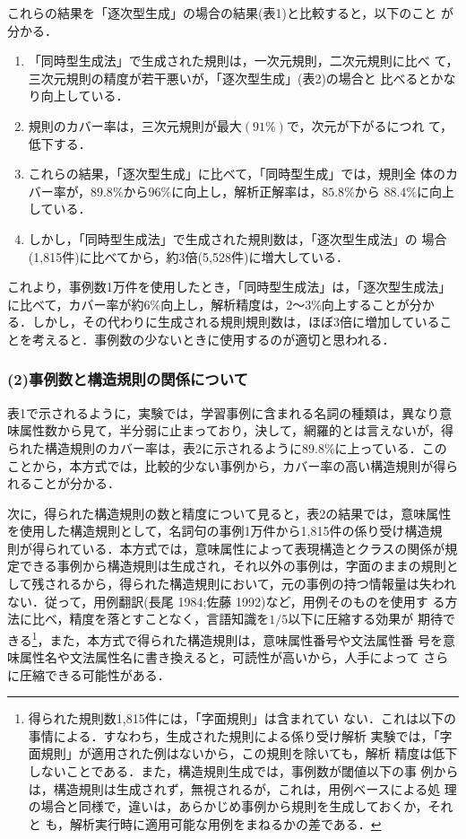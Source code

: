 これらの結果を「逐次型生成」の場合の結果(表1)と比較すると，以下のこと
が分かる．\vspace{\baselineskip}
\begin{enumerate}
 \item 「同時型生成法」で生成された規則は，一次元規則，二次元規則に比べ
       て，三次元規則の精度が若干悪いが，「逐次型生成」(表2)の場合と
       比べるとかなり向上している．
 \item 規則のカバー率は，三次元規則が最大$(91\%)$で，次元が下がるにつれ
       て，低下する．
 \item これらの結果，「逐次型生成」に比べて，「同時型生成」では，規則全
       体のカバー率が，$89.8\%$から$96\%$に向上し，解析正解率は，$85.8\%$から
       $88.4\%$に向上している．
 \item しかし，「同時型生成法」で生成された規則数は，「逐次型生成法」の
       場合(1,815件)に比べてから，約3倍(5,528件)に増大している．
\end{enumerate}\vspace{\baselineskip}

これより，事例数1万件を使用したとき，「同時型生成法」は，「逐次型生成法」
に比べて，カバー率が約$6\%$向上し，解析精度は，$2〜3\%$向上することが分か
る．しかし，その代わりに生成される規則規則数は，ほぼ3倍に増加しているこ
とを考えると．事例数の少ないときに使用するのが適切と思われる．
\subsubsection*{(2)事例数と構造規則の関係について}

表1で示されるように，実験では，学習事例に含まれる名詞の種類は，異なり意
味属性数から見て，半分弱に止まっており，決して，網羅的とは言えないが，得
られた構造規則のカバー率は，表2に示されるように89.8\%に上っている．この
ことから，本方式では，比較的少ない事例から，カバー率の高い構造規則が得ら
れることが分かる．

次に，得られた構造規則の数と精度について見ると，表2の結果では，意味属性
を使用した構造規則として，名詞句の事例1万件から1,815件の係り受け構造規
則が得られている．本方式では，意味属性によって表現構造とクラスの関係が規
定できる事例から構造規則は生成され，それ以外の事例は，字面のままの規則と
して残されるから，得られた構造規則において，元の事例の持つ情報量は失われ
ない．従って，用例翻訳(長尾 1984;佐藤 1992)など，用例そのものを使用す
る方法に比べ，精度を落とすことなく，言語知識を$1/5$以下に圧縮する効果が
期待できる\footnote{得られた規則数1,815件には，「字面規則」は含まれてい
ない．これは以下の事情による．すなわち，生成された規則による係り受け解析
実験では，「字面規則」が適用された例はないから，この規則を除いても，解析
精度は低下しないことである．また，構造規則生成では，事例数が閾値以下の事
例からは，構造規則は生成されず，無視されるが，これは，用例ベースによる処
理の場合と同様で，違いは，あらかじめ事例から規則を生成しておくか，それと
も，解析実行時に適用可能な用例をまねるかの差である．}，また，本方式で得られた構造規則は，意味属性番号や文法属性番
号を意味属性名や文法属性名に書き換えると，可読性が高いから，人手によって
さらに圧縮できる可能性がある．

